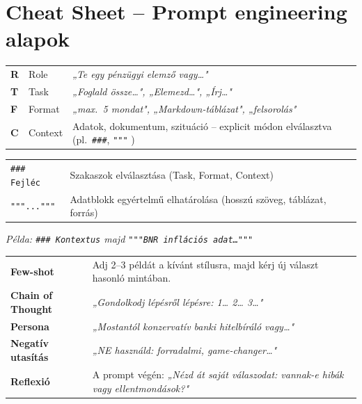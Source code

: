 \documentclass[11pt,a4paper]{article}
\begin{document}
\newpage
\section*{Cheat Sheet -- Prompt engineering alapok}

\begin{tcolorbox}[cheatstyle, title={RTFC keretrendszer}]
\begin{tabularx}{\linewidth}{@{}llX@{}}
\textbf{R} & Role    & \textit{„Te egy pénzügyi elemző vagy\ldots"} \\
\textbf{T} & Task    & \textit{„Foglald össze\ldots", „Elemezd\ldots", „Írj\ldots"} \\
\textbf{F} & Format  & \textit{„max.\ 5 mondat", „Markdown-táblázat", „felsorolás"} \\
\textbf{C} & Context & Adatok, dokumentum, szituáció -- explicit módon elválasztva (pl.\ \texttt{\#\#\#}, \texttt{"""} ) \\
\end{tabularx}
\end{tcolorbox}

\smallskip

\begin{tcolorbox}[cheatstyle, title={Delimiterek}]
\begin{tabular}{@{}ll@{}}
\texttt{\#\#\# Fejléc} & Szakaszok elválasztása (Task, Format, Context) \\[3pt]
\texttt{"""..."""}     & Adatblokk egyértelmű elhatárolása (hosszú szöveg, táblázat, forrás) \\
\end{tabular}

\smallskip\noindent
\textit{Példa: \texttt{\#\#\# Kontextus} majd \texttt{"""BNR inflációs adat\ldots"""}}
\end{tcolorbox}

\smallskip

\begin{tcolorbox}[cheatstyle, title={5 haladó prompttechnika}]
\begin{tabularx}{\linewidth}{@{}lX@{}}
\textbf{Few-shot}         & Adj 2--3 példát a kívánt stílusra, majd kérj új választ hasonló mintában. \\[3pt]
\textbf{Chain of Thought} & \textit{„Gondolkodj lépésről lépésre: 1\ldots{} 2\ldots{} 3\ldots"} \\[3pt]
\textbf{Persona}          & \textit{„Mostantól konzervatív banki hitelbíráló vagy\ldots"} \\[3pt]
\textbf{Negatív utasítás} & \textit{„NE használd: forradalmi, game-changer\ldots"} \\[3pt]
\textbf{Reflexió}         & A prompt végén: \textit{„Nézd át saját válaszodat: vannak-e hibák vagy ellentmondások?"} \\
\end{tabularx}
\end{tcolorbox}
\end{document}
